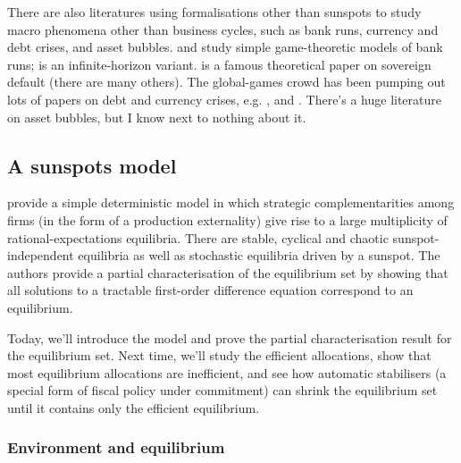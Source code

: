 \documentclass[11pt,letterpaper,reqno,oneside]{article}
\begin{document}
There are also literatures using formalisations other than sunspots to study macro phenomena other than business cycles, such as bank runs, currency and debt crises, and asset bubbles. \textcite{Bryant1980} and \textcite{DiamondDybvig1983} study simple game-theoretic models of bank runs; \textcite{GertlerKiyotaki2015} is an infinite-horizon variant. \textcite{ColeKehoe2000} is a famous theoretical paper on sovereign default (there are many others). The global-games crowd has been pumping out lots of papers on debt and currency crises, e.g. \textcite{AngeletosWerning2006}, \textcite{AngeletosHellwigPavan2006} and \textcite{AngeletosHellwigPavan2007}. There's a huge literature on asset bubbles, but I know next to nothing about it.



\subsection{A sunspots model 
	\texorpdfstring{\parencite{ChristianoHarrison1999}}{Christiano and Harrison (1999)}}
\label{sec:25Nov2015:sunspots_ChristianoHarrison1999}

\textcite{ChristianoHarrison1999} provide a simple deterministic model in which strategic complementarities among firms (in the form of a production externality) give rise to a large multiplicity of rational-expectations equilibria. There are stable, cyclical and chaotic sunspot-independent equilibria as well as stochastic equilibria driven by a sunspot. The authors provide a partial characterisation of the equilibrium set by showing that all solutions to a tractable first-order difference equation correspond to an equilibrium.

Today, we'll introduce the model and prove the partial characterisation result for the equilibrium set. Next time, we'll study the efficient allocations, show that most equilibrium allocations are inefficient, and see how automatic stabilisers (a special form of fiscal policy under commitment) can shrink the equilibrium set until it contains only the efficient equilibrium.



\subsubsection{Environment and equilibrium}
\label{sec:25Nov2015:sunspots_ChristianoHarrison1999:environment}
\end{document}
